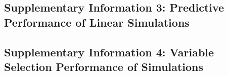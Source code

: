 \documentclass[
]{article}
\begin{document}
\clearpage

\subsection{Supplementary Information 3: Predictive Performance of Linear Simulations}



\clearpage

\subsection{Supplementary Information 4: Variable Selection Performance of Simulations}



\end{document}

